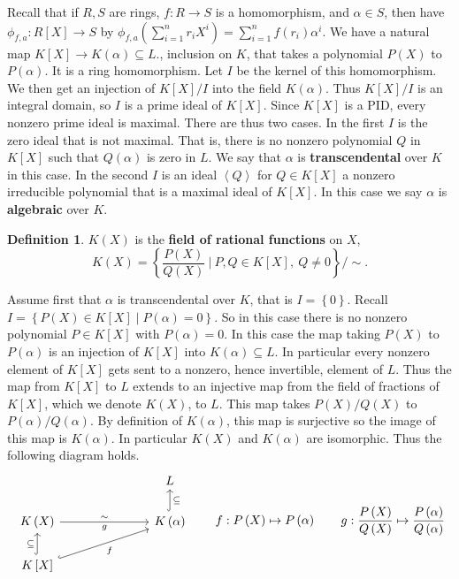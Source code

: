 \documentclass{article}
\newcommand{\rb}[1]{\left( #1 \right)}
\renewcommand{\sb}[1]{\left[ #1 \right]}
\newcommand{\cb}[1]{\left\{ #1 \right\}}
\newcommand{\ab}[1]{\left\langle #1 \right\rangle}
\theoremstyle{definition}\newtheorem{definition}{Definition}[subsection]
\theoremstyle{definition}\newtheorem{remark}[definition]{Remark}
\theoremstyle{definition}\newtheorem*{example}{Example}
\theoremstyle{definition}\newtheorem*{note}{Note}
\begin{document}
Recall that if $ R, S $ are rings, $ f : R \to S $ is a homomorphism, and $ \alpha \in S $, then have $ \phi_{f, a} : R\sb{X} \to S $ by $ \phi_{f, a}\rb{\sum_{i = 1}^n r_iX^i} = \sum_{i = 1}^n f\rb{r_i}\alpha^i $. We have a natural map $ K\sb{X} \to K\rb{\alpha} \subseteq L. $, inclusion on $ K $, that takes a polynomial $ P\rb{X} $ to $ P\rb{\alpha} $. It is a ring homomorphism. Let $ I $ be the kernel of this homomorphism. We then get an injection of $ K\sb{X} / I $ into the field $ K\rb{\alpha} $. Thus $ K\sb{X} / I $ is an integral domain, so $ I $ is a prime ideal of $ K\sb{X} $. Since $ K\sb{X} $ is a PID, every nonzero prime ideal is maximal. There are thus two cases. In the first $ I $ is the zero ideal that is not maximal. That is, there is no nonzero polynomial $ Q $ in $ K\sb{X} $ such that $ Q\rb{\alpha} $ is zero in $ L $. We say that $ \alpha $ is \textbf{transcendental} over $ K $ in this case. In the second $ I $ is an ideal $ \ab{Q} $ for $ Q \in K\sb{X} $ a nonzero irreducible polynomial that is a maximal ideal of $ K\sb{X} $. In this case we say $ \alpha $ is \textbf{algebraic} over $ K $.

\begin{definition}
$ K\rb{X} $ is the \textbf{field of rational functions} on $ X $,
$$ K\rb{X} = \cb{\dfrac{P\rb{X}}{Q\rb{X}} \ \Bigg| \ P, Q \in K\sb{X}, \ Q \ne 0} / \sim. $$
\end{definition}

Assume first that $ \alpha $ is transcendental over $ K $, that is $ I = \cb{0} $. Recall $ I = \cb{P\rb{X} \in K\sb{X} \mid P\rb{\alpha} = 0} $. So in this case there is no nonzero polynomial $ P \in K\sb{X} $ with $ P\rb{\alpha} = 0 $. In this case the map taking $ P\rb{X} $ to $ P\rb{\alpha} $ is an injection of $ K\sb{X} $ into $ K\rb{\alpha} \subseteq L $. In particular every nonzero element of $ K\sb{X} $ gets sent to a nonzero, hence invertible, element of $ L $. Thus the map from $ K\sb{X} $ to $ L $ extends to an injective map from the field of fractions of $ K\sb{X} $, which we denote $ K\rb{X} $, to $ L $. This map takes $ P\rb{X} / Q\rb{X} $ to $ P\rb{\alpha} / Q\rb{\alpha} $. By definition of $ K\rb{\alpha} $, this map is surjective so the image of this map is $ K\rb{\alpha} $. In particular $ K\rb{X} $ and $ K\rb{\alpha} $ are isomorphic. Thus the following diagram holds.
$$
\begin{tikzcd}[column sep=1in]
& L \\
K\rb{X} \arrow{r}{\sim}[swap]{g} & K\rb{\alpha} \arrow[hookrightarrow, swap]{u}{\subseteq} \\
K\sb{X} \arrow[hookrightarrow]{u}{\subseteq} \arrow[hookrightarrow, swap]{ur}{f}
\end{tikzcd}
\qquad f : P\rb{X} \mapsto P\rb{\alpha} \qquad g : \dfrac{P\rb{X}}{Q\rb{X}} \mapsto \dfrac{P\rb{\alpha}}{Q\rb{\alpha}}
$$
\end{document}
